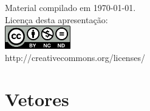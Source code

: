 \documentclass[portuguese,10pt,xcolor=table]{bredelebeamer}
\title{\insertlecture}
\author{Prof. Fernando Figueira\\(adaptado do material do Prof. Rafael Beserra Gomes)}
\institute{UFRN}
\date{}
\begin{document}
\begin{frame}
	\maketitle
	\begin{center}
		\tiny
		Material compilado em \today.\\
		Licença desta apresentação:\\
		\includegraphics[height=1.0cm]{by-nc-nd.png}\\
		http://creativecommons.org/licenses/
	\end{center}
\end{frame}


\def\GN[#1]{\colorbox{gray!40}{#1}}
\def\RN[#1]{\colorbox{red!40}{#1}}
\def\BN[#1]{\colorbox{blue!40}{#1}}
\def\ON[#1]{\colorbox{orange!40}{#1}}
\def\WN[#1]{\colorbox{white!40}{#1}}


	\section{Vetores}

		\begin{frame}[c]
			\begin{center}
			\end{center}
		\end{frame} 
\end{document}
